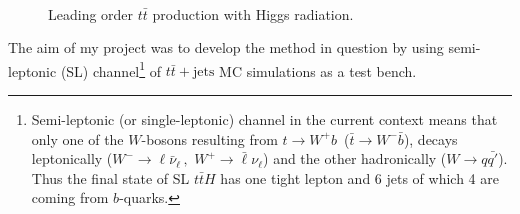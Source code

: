\documentclass[12pt,a4paper]{article}
\begin{document}
\begin{figure}[H]
	\begin{center}
	~~~~~~~~~~
	\caption{Leading order $t\bar{t}$ production with Higgs radiation.}
	\label{fig:ttH}
	\end{center}
\end{figure}

The aim of my project was to develop the method in question by using semi-leptonic (SL) channel\footnote{Semi-leptonic (or single-leptonic) channel in the current context means that only one of the $W$-bosons resulting from $t\to W^+b\,$ ($\bar{t}\to W^-\bar{b}$), decays leptonically ($W^-\to \mathcal{\ell}\bar{\nu}_\mathcal{\ell}\,,\,\,W^+\to \bar{\mathcal{\ell}}\nu_\mathcal{\ell}$) and the other hadronically ($W\to q\bar{q'}$). Thus the final state of SL $t\bar{t}H$ has one tight lepton and 6 jets of which 4 are coming from $b$-quarks.}
of $t\bar{t}+\mbox{jets}$ MC simulations as a test bench.
\end{document}

